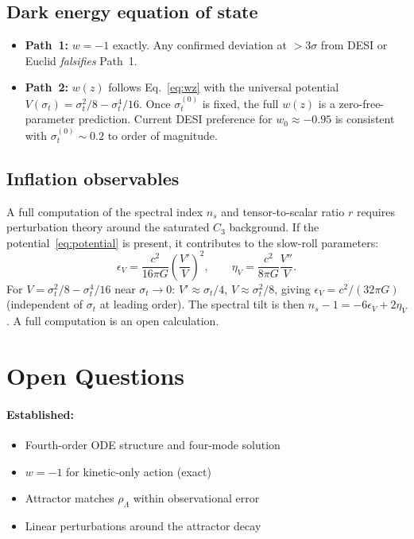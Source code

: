 \documentclass[11pt,a4paper]{article}
\theoremstyle{plain}
\theoremstyle{definition}
\theoremstyle{remark}
\begin{document}
\subsection{Dark energy equation of state}

\begin{itemize}
  \item \textbf{Path~1:} $w = -1$ exactly.  Any confirmed deviation at
    $> 3\sigma$ from DESI or Euclid \emph{falsifies} Path~1.
  \item \textbf{Path~2:} $w(z)$ follows Eq.~\eqref{eq:wz} with the
    universal potential $V(\sigma_t) = \sigma_t^2/8 - \sigma_t^4/16$.
    Once $\sigma_t^{(0)}$ is fixed, the full $w(z)$ is a
    zero-free-parameter prediction.  Current DESI preference for
    $w_0 \approx -0.95$ is consistent with $\sigma_t^{(0)} \sim 0.2$
    to order of magnitude.
\end{itemize}

\subsection{Inflation observables}

A full computation of the spectral index $n_s$ and tensor-to-scalar
ratio $r$ requires perturbation theory around the saturated $C_3$
background.  If the potential~\eqref{eq:potential} is present, it
contributes to the slow-roll parameters:
\begin{equation}
  \epsilon_V = \frac{c^2}{16\pi G}\left(\frac{V'}{V}\right)^2, \qquad
  \eta_V = \frac{c^2}{8\pi G}\frac{V''}{V}.
\end{equation}
For $V = \sigma_t^2/8 - \sigma_t^4/16$ near $\sigma_t \to 0$:
$V' \approx \sigma_t/4$, $V \approx \sigma_t^2/8$, giving $\epsilon_V
= c^2/(32\pi G)$ (independent of $\sigma_t$ at leading order).
The spectral tilt is then $n_s - 1 = -6\epsilon_V + 2\eta_V$.
A full computation is an open calculation.

\section{Open Questions}
\label{sec:open}

\paragraph{Established:}
\begin{itemize}
  \item Fourth-order ODE structure and four-mode solution
  \item $w = -1$ for kinetic-only action (exact)
  \item Attractor matches $\rho_\Lambda$ within observational error
  \item Linear perturbations around the attractor decay
\end{itemize}
\end{document}
